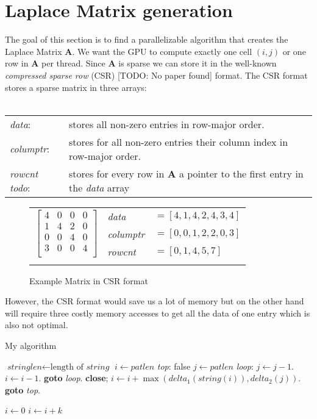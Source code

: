 \section{Laplace Matrix generation}
The goal of this section is to find a parallelizable algorithm that creates the Laplace Matrix \textbf{A}. We want the GPU to compute exactly one cell $(i,j)$ or one row in \textbf{A} per thread. Since \textbf{A} is sparse we can store it in the well-known \textit{compressed sparse row} (CSR) [TODO: No paper found] format. The CSR format stores a sparse matrix in three arrays:\\\\
\begin{tabular}{ll}
	\textit{data}: & stores all non-zero entries in row-major order.\\
	\textit{columptr}: & stores for all non-zero entries their column index in row-major order.\\
	\textit{rowcnt todo}: & stores for every row in \textbf{A} a pointer to the first entry in the \textit{data} array\\
\end{tabular}
\begin{figure*}
	\centering
	\begin{tabular}{lll}
	\multirow{3}{*}{$\left[ {\begin{array}{cccc}
   4 & 0 & 0 & 0  \\
   1 & 4 & 2 & 0  \\
   0 & 0 & 4 & 0  \\
   3 & 0 & 0 & 4  \\
  \end{array} } \right]$}
	& \textit{data} & $=[4,1,4,2,4,3,4]$  \\
	& \textit{columptr} & $=[0,0,1,2,2,0,3]$ \\
	& \textit{rowcnt} & $=[0,1,4,5,7]$ \\
	& & 
	\end{tabular}
\caption{Example Matrix in CSR format}\label{fig:csr-matrix}
\end{figure*}
\newpage
\par However, the CSR format would save us a lot of memory but on the other hand will require three costly memory accesses to get all the data of one entry which is also not optimal. \\


\newpage
\begin{algorithm}
\caption{My algorithm}\label{euclid}
\begin{algorithmic}[1]
\State $\textit{stringlen} \gets \text{length of }\textit{string}$
\State $i \gets \textit{patlen}$
\BState \emph{top}:
 \Return false
\EndIf
\State $j \gets \textit{patlen}$
\BState \emph{loop}:
\State $j \gets j-1$.
\State $i \gets i-1$.
\State \textbf{goto} \emph{loop}.
\State \textbf{close};
\EndIf
\State $i \gets i+\max(\textit{delta}_1(\textit{string}(i)),\textit{delta}_2(j))$.
\State \textbf{goto} \emph{top}.
\EndProcedure
\end{algorithmic}
\end{algorithm}

\begin{algorithmic}
    \State $i\gets 0$
\Else
        \State $i\gets i+k$
    \EndIf
\EndIf
\end{algorithmic}